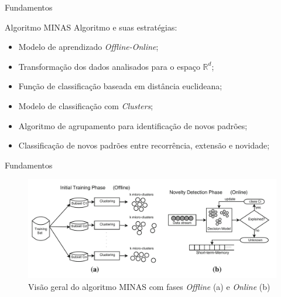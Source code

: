 \documentclass[aspectratio=43,10pt]{beamer}
\newcommand{\nota}[1]{\hspace*{-0.5cm}\textit{{\color[rgb]{1,0,0}Nota: #1}}}
\begin{document}
\begin{frame}[fragile]{Fundamentos}
\begin{alertblock}{Algoritmo MINAS}
  \vspace{5mm}
  Algoritmo e suas estratégias:
  \begin{itemize}
    \item Modelo de aprendizado \emph{Offline-Online};
    \item Transformação dos dados analisados para o espaço $\mathbb{R}^d$;
    \item Função de classificação baseada em distância euclideana;
    \item Modelo de classificação com \emph{Clusters};
    \item Algoritmo de agrupamento para identificação de novos padrões;
    \item Classificação de novos padrões entre recorrência, extensão e novidade;
  \end{itemize}
\end{alertblock}
\end{frame}

\begin{frame}[fragile]{Fundamentos}
  \begin{figure}[ht]
    \centering
    \includegraphics[width=\textwidth]{figuras/FariaMinas2015-fases.png}
    \caption{Visão geral do algoritmo MINAS com fases \emph{Offline} (a) e 
    \emph{Online} (b) \cite{Faria2016minas}}
    \label{fig:minas}
  \end{figure}
\end{frame}
\end{document}
